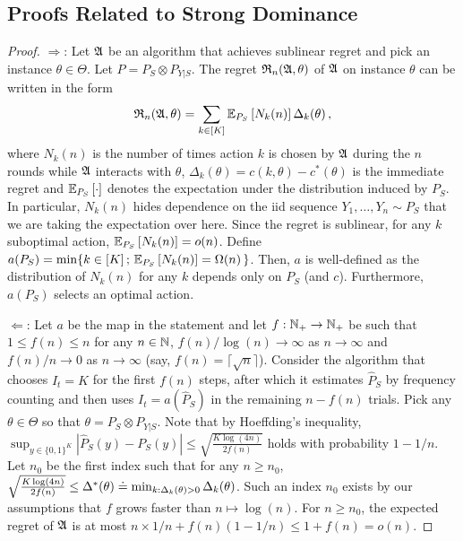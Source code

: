 \subsection{Proofs Related to Strong Dominance}
\propLearnablemap*
\begin{proof}
	$\Rightarrow$: Let $\mathfrak{A}$ be an algorithm that achieves sublinear regret
	and pick  an instance  $\theta \in\Theta$. Let $P = P_S \otimes P_{Y|S}$.
	The regret $\mathfrak{R}_n(\mathfrak{A},\theta)$ of $\mathfrak{A}$ on instance $\theta$ can be written in the form
	\begin{align*}
	\mathfrak{R}_n(\mathfrak{A},\theta) = \sum_{k\in [K]} \mathbb{E}_{P_S}\left[N_k(n)\right] \Delta_k(\theta)\,,
	\end{align*}
	where $N_k(n)$ is the number of times action $k$ is chosen by $\mathfrak{A}$ during the $n$ rounds while
	$\mathfrak{A}$ interacts with $\theta$, $\Delta_k(\theta) = c(k,\theta) - c^*(\theta)$ is the immediate regret
	and $\mathbb{E}_{P_S}\left[\cdot\right]$ denotes the expectation under the distribution induced by $P_S$.
	In particular, $N_k(n)$ hides dependence on the iid sequence $Y_1,\dots,Y_n \sim P_S$ 
	that we are taking the expectation over here. 
	Since the regret is sublinear, for any $k$ suboptimal action, $\mathbb{E}_{P_S}\left[N_k(n)\right] = o(n)$. 
	Define $a(P_S) = \min \{ k\in [K]\,;\, \mathbb{E}_{P_S}\left[N_k(n)\right] = \Omega(n) \,\}$. Then, $a$ is well-defined as the distribution of $N_k(n)$ for any $k$ depends only on $P_S$ (and $c$). Furthermore, $a(P_S)$ selects an optimal action.
	
	$\Leftarrow$: Let $a$ be the map in the statement and let $f:\mathbb{N}_+\to\mathbb{N}_+$ be such that $1\le f(n)\le n$ for any  $n\in \mathbb{N}$,
	$f(n)/\log(n) \to \infty$ as $n\to \infty$ and $f(n)/n \to 0$ as $n\to \infty$ (say, $f(n) = \lceil \sqrt{n} \rceil$).
	Consider the algorithm that chooses $I_t = K$ for the first $f(n)$ steps, after which it estimates $\hat{P}_S$ by
	frequency counting and then uses $I_t = a(\hat{P}_S)$ in the remaining $n-f(n)$ trials. 
	Pick any $\theta \in \Theta$ so that $\theta = P_S \otimes P_{Y|S}$. 
	Note that by Hoeffding's inequality, 
	$\sup_{y\in \{0,1\}^K} |\hat{P}_S(y)  - P_S(y)| \le \sqrt{\frac{K\log(4n)}{2f(n)}}$ holds with probability $1-1/n$.
	Let $n_0$ be the first index such that for any $n\ge n_0$,
	$\sqrt{\frac{K\log(4n)}{2f(n)}}\le \Delta^*(\theta) \doteq \min_{k:\Delta_k(\theta)>0} \Delta_k(\theta)$.
	Such an index $n_0$ exists by our assumptions that $f$ grows faster than $n \mapsto \log(n)$.
	For $n\ge n_0$, the expected regret of $\mathfrak{A}$ is at most $n \times 1/n + f(n) (1-1/n) \le 1+f(n) = o(n)$.
\end{proof}


